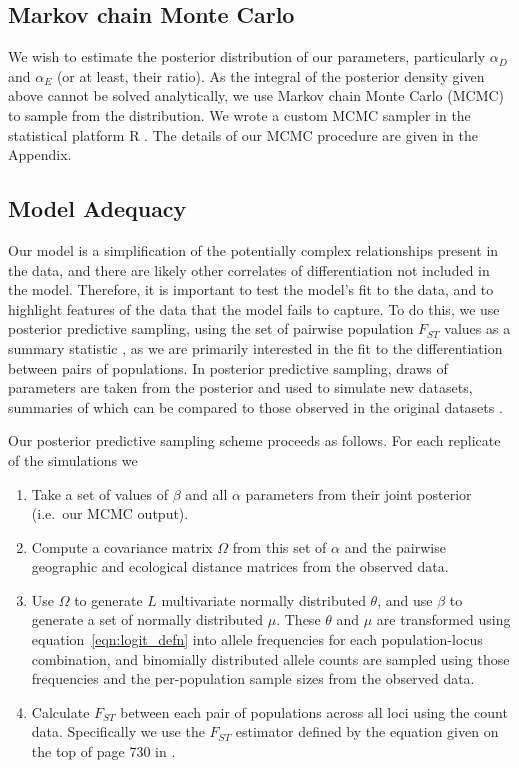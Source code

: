 \subsection*{Markov chain Monte Carlo}
We wish to estimate the posterior distribution of our parameters, particularly $\alpha_{D}$ and $\alpha_{E}$ (or at least, their ratio).  As the integral of the posterior density given above cannot be solved analytically, we use Markov chain Monte Carlo (MCMC) to sample from the distribution.  We wrote a custom MCMC sampler in the statistical platform R \citep{R}.   
The details of our MCMC procedure are given in the Appendix.

\subsection*{Model Adequacy}
Our model is a simplification of the potentially complex relationships present in the data, and there are likely other correlates of differentiation not included in the model. Therefore, it is important to test the model's fit to the data, 
and to highlight features of the data that the model fails to capture.
To do this, we use posterior predictive sampling, using the set of pairwise population $F_{ST}$ values as a summary statistic \citep{WeirHill2002}, 
as we are primarily interested in the fit to the differentiation between pairs of populations.  In posterior predictive sampling, draws of parameters are taken from the posterior and used to simulate new datasets, summaries of which can be compared to those observed in the original datasets \citep{Gelman1996}.

Our posterior predictive sampling scheme proceeds as follows. For each replicate of the simulations we
\begin{enumerate}
\item Take a set of values of $\beta$ and all $\alpha$ parameters from their joint posterior (i.e.\ our MCMC output). 
\item Compute a covariance matrix $\Omega$ from this set of $\alpha$ and the pairwise geographic and ecological distance matrices from the observed data.
\item Use $\Omega$ to generate $L$ multivariate normally distributed $\theta$, and use $\beta$ to generate a set of normally distributed $\mu$.  
  These $\theta$ and $\mu$ are transformed using equation~\eqref{eqn:logit_defn} into allele frequencies for each population-locus combination, and binomially distributed allele counts are sampled using those frequencies and the per-population sample sizes from the observed data.
\item Calculate $F_{ST}$ between each pair of populations across all loci using the count data. Specifically we use the $F_{ST}$ estimator defined by the equation given on the top of page 730 in \citet{WeirHill2002}.
\end{enumerate}

